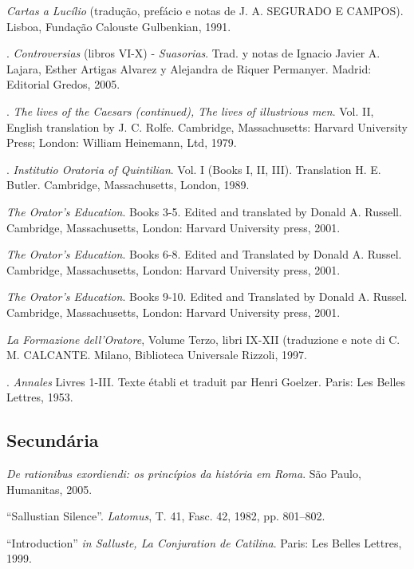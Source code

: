 \begin{bibliohedra}
 \emph{Cartas a Lucílio} (tradução, prefácio e notas de J. A. SEGURADO E CAMPOS). Lisboa, Fundação Calouste Gulbenkian, 1991.

. \emph{Controversias} (libros VI-X) - \emph{Suasorias}. Trad. y notas de Ignacio Javier A. Lajara, Esther Artigas Alvarez y Alejandra de Riquer Permanyer. Madrid: Editorial Gredos, 2005. 

. \emph{The lives of the Caesars (continued), The lives of illustrious men}. Vol. II, English translation by J. C. Rolfe. Cambridge, Massachusetts: Harvard University Press; London: William Heinemann, Ltd, 1979.

. \emph{Institutio Oratoria of Quintilian}. Vol. I (Books I, II, III). Translation H. E. Butler. Cambridge, Massachusetts, London, 1989.

\titidem \emph{The Orator’s Education}. Books 3-5. Edited and translated by Donald A. Russell. Cambridge, Massachusetts, London: Harvard University press, 2001.

\titidem \emph{The Orator’s Education}. Books 6-8. Edited and Translated by Donald A. Russel. Cambridge, Massachusetts, London: Harvard University press, 2001.


\titidem \emph{The Orator’s Education}. Books 9-10. Edited and Translated by Donald A. Russel. Cambridge, Massachusetts, London: Harvard University press, 2001.

 \emph{La Formazione dell’Oratore}, Volume Terzo, libri IX-XII (traduzione e note di C. M. CALCANTE. Milano, Biblioteca Universale Rizzoli, 1997.


.  \emph{Annales} Livres 1-III. Texte établi et traduit par Henri Goelzer. Paris: Les Belles Lettres, 1953. 



\subsection{Secundária}



 \emph{De rationibus exordiendi: os princípios da história em Roma}. São Paulo, Humanitas, 2005.



 ``Sallustian Silence”. \emph{Latomus}, T. 41, Fasc. 42, 1982, pp. 801–802.



 ``Introduction'' \emph{in Salluste, La Conjuration de Catilina}. Paris: Les Belles Lettres, 1999.  


\end{bibliohedra}
